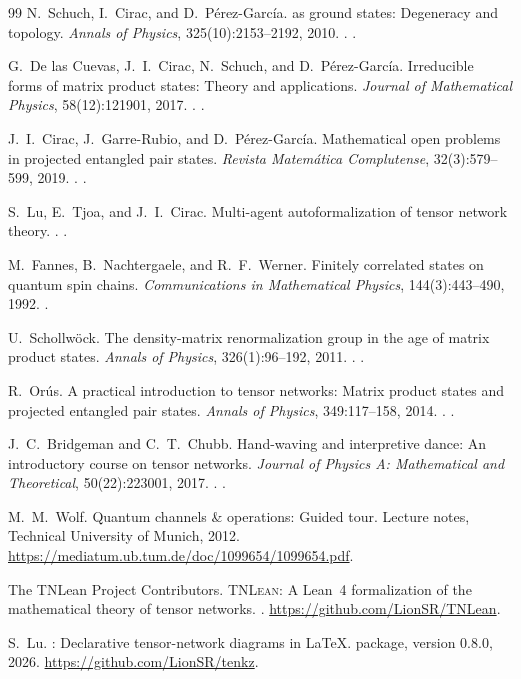 \begin{thebibliography}{99}
N.~Schuch, I.~Cirac, and D.~P{\'e}rez-Garc{\'i}a.
 as ground states: Degeneracy and topology.
\newblock \emph{Annals of Physics}, 325(10):2153--2192, 2010.
\newblock {}. .

G.~De las Cuevas, J.~I.~Cirac, N.~Schuch, and D.~P{\'e}rez-Garc{\'i}a.
\newblock Irreducible forms of matrix product states: Theory and
  applications.
\newblock \emph{Journal of Mathematical Physics}, 58(12):121901, 2017.
\newblock {}. .

J.~I.~Cirac, J.~Garre-Rubio, and D.~P{\'e}rez-Garc{\'i}a.
\newblock Mathematical open problems in projected entangled pair states.
\newblock \emph{Revista Matem{\'a}tica Complutense}, 32(3):579--599, 2019.
\newblock {}. .

S.~Lu, E.~Tjoa, and J.~I.~Cirac.
\newblock Multi-agent autoformalization of tensor network theory.
.
\newblock {}.

M.~Fannes, B.~Nachtergaele, and R.~F.~Werner.
\newblock Finitely correlated states on quantum spin chains.
\newblock \emph{Communications in Mathematical Physics}, 144(3):443--490, 1992.
\newblock {}.

U.~Schollw{\"o}ck.
\newblock The density-matrix renormalization group in the age of matrix
  product states.
\newblock \emph{Annals of Physics}, 326(1):96--192, 2011.
\newblock {}. .

R.~Or{\'u}s.
\newblock A practical introduction to tensor networks: Matrix product states
  and projected entangled pair states.
\newblock \emph{Annals of Physics}, 349:117--158, 2014.
\newblock {}. .

J.~C.~Bridgeman and C.~T.~Chubb.
\newblock Hand-waving and interpretive dance: An introductory course on tensor
  networks.
\newblock \emph{Journal of Physics A: Mathematical and Theoretical},
  50(22):223001, 2017.
\newblock {}. .

M.~M.~Wolf.
\newblock Quantum channels \& operations: Guided tour.
\newblock Lecture notes, Technical University of Munich, 2012.
\newblock \url{https://mediatum.ub.tum.de/doc/1099654/1099654.pdf}.

The TNLean Project Contributors.
\newblock \textsc{TNLean}: A Lean~4 formalization of the mathematical theory of
  tensor networks.
.
\newblock \url{https://github.com/LionSR/TNLean}.

S.~Lu.
\newblock \pkg{}: Declarative tensor-network diagrams in {\LaTeX}.
\newblock {\LaTeX} package, version 0.8.0, 2026.
\newblock \url{https://github.com/LionSR/tenkz}.

\end{thebibliography}
